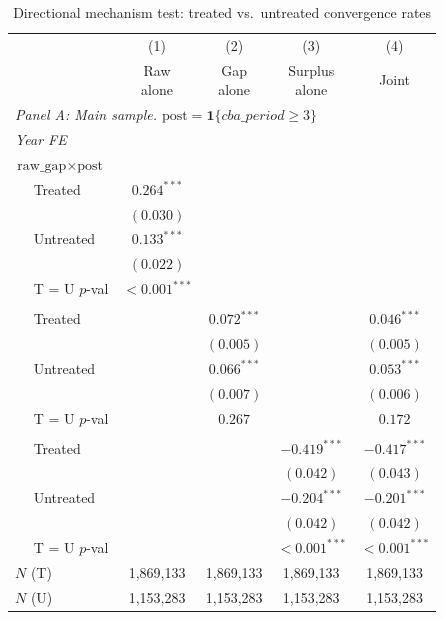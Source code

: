\begin{table}[H]
\centering
\caption{Directional mechanism test: treated vs.\ untreated convergence rates}
\label{tab:mechanism_test_directional}
\scriptsize
\begin{tabular}{lcccc}
\toprule\toprule
 & (1) & (2) & (3) & (4) \\
 & \shortstack{Raw \\ alone} & \shortstack{Gap \\ alone} & \shortstack{Surplus \\ alone} & Joint \\
\midrule
\multicolumn{5}{l}{\textit{Panel A: Main sample. $\text{post} = \mathbf{1}\{cba\_period \geq 3\}$}} \\
\midrule
\multicolumn{5}{l}{\textit{Year FE}} \\
\multicolumn{5}{l}{$\text{raw\_gap} \times \text{post}$} \\
$\quad$ Treated & $0.264^{***}$ &  &  &  \\
 & $(0.030)$ &  &  &  \\
$\quad$ Untreated & $0.133^{***}$ &  &  &  \\
 & $(0.022)$ &  &  &  \\
$\quad$ T = U $p$-val & $<\!0.001^{***}$ &  &  &  \\
\addlinespace[2pt]
\multicolumn{5}{l}{$\text{gap} \times \text{post}$} \\
$\quad$ Treated &  & $0.072^{***}$ &  & $0.046^{***}$ \\
 &  & $(0.005)$ &  & $(0.005)$ \\
$\quad$ Untreated &  & $0.066^{***}$ &  & $0.053^{***}$ \\
 &  & $(0.007)$ &  & $(0.006)$ \\
$\quad$ T = U $p$-val &  & $0.267$ &  & $0.172$ \\
\addlinespace[2pt]
\multicolumn{5}{l}{$\text{surplus} \times \text{post}$} \\
$\quad$ Treated &  &  & $-0.419^{***}$ & $-0.417^{***}$ \\
 &  &  & $(0.042)$ & $(0.043)$ \\
$\quad$ Untreated &  &  & $-0.204^{***}$ & $-0.201^{***}$ \\
 &  &  & $(0.042)$ & $(0.042)$ \\
$\quad$ T = U $p$-val &  &  & $<\!0.001^{***}$ & $<\!0.001^{***}$ \\
\addlinespace[2pt]
$N$ (T) & 1,869,133 & 1,869,133 & 1,869,133 & 1,869,133 \\
$N$ (U) & 1,153,283 & 1,153,283 & 1,153,283 & 1,153,283 \\

\end{tabular}
\end{table}
